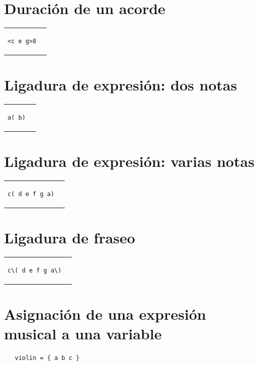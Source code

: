 \documentclass[10pt,a4paper,oneside,headinclude,titlepage]{scrartcl}
\begin{document}
\section*{Duración de un acorde}
\begin{tabular}{m{2cm}m{2cm}}
\begin{verbatim}
<c e g>8
\end{verbatim}
&
\begin[fragment,relative=1,notime]{lilypond}
<c e g>8
\end{lilypond}
\end{tabular}

\section*{Ligadura de expresión: dos notas}
\begin{tabular}{m{2cm}m{2cm}}
\begin{verbatim}
a( b)
\end{verbatim}
&
\begin[fragment,relative=1,notime]{lilypond}
a( b)
\end{lilypond}
\end{tabular}

\section*{Ligadura de expresión: varias notas}
\begin{tabular}{m{2cm}m{2cm}}
\begin{verbatim}
c( d e f g a)
\end{verbatim}
&
\begin[fragment,relative=1,notime]{lilypond}
c( d e f g a)
\end{lilypond}
\end{tabular}

\section*{Ligadura de fraseo}
\begin{tabular}{m{2.5cm}m{2cm}}
\begin{verbatim}
c\( d e f g a\)
\end{verbatim}
&
\begin[fragment,relative=1,notime]{lilypond}
c\( d e f g a\)
\end{lilypond}
\end{tabular}

\section*{Asignación de una expresión musical a una variable}
\begin{verbatim}
   violin = { a b c }
\end{verbatim}
\end{document}
